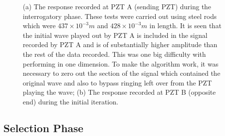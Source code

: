\begin{figure}
\begin{subfigmatrix}{2}
\end{subfigmatrix}

  \caption
  { \label{fig:initialPhaseRead}
(a) The response recorded at PZT A (sending PZT) during the interrogatory phase. These tests were carried out using steel rods which were $437 \times 10^{-3} m$ and $428 \times 10^{-3} m$ in length. It is seen that the initial wave played out by PZT A is included in the signal recorded by PZT A and is of substantially higher amplitude than the rest of the data recorded. This was one big difficulty with performing in one dimension. To make the algorithm work, it was necessary to zero out the section of the signal which contained the original wave and also to bypass ringing left over from the PZT playing the wave;
(b) The response recorded at PZT B (opposite end) during the initial iteration.
}
\end{figure}

\subsection{Selection Phase}


